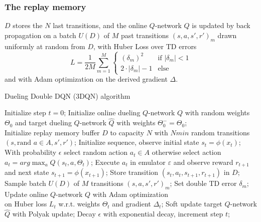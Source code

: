 \documentclass[journal]{IEEEtran}
\begin{document}
\subsubsection{The replay memory} $D$ stores the $N$ last transitions, and the online $Q$-network $Q$ is updated by back propagation on a batch $U(D)$ of $M$ past transitions $(s,a,s',r')_m$ drawn uniformly at random from $D$, with Huber Loss over TD errors
\[ 
L = \frac{1}{2M}\sum_{m=1}^M
\begin{cases}
  (\delta_m)^2 & \text{if } |\delta_m| < 1 \\
  2 \cdot |\delta_m| - 1 & \text{else}
\end{cases}
\]
and with Adam optimization \cite{kingma2017adam} on the derived gradient $\Delta$.

\begin{algorithm}[H]
\caption*{Dueling Double DQN (3DQN) algorithm}
\begin{algorithmic}
    \STATE Initialize step $t = 0$;
    \STATE Initialize online dueling $Q$-network $Q$ with random weights $\Theta_0$ and target dueling $Q$-network $\widehat{Q}$ with weights $\Theta^-_0 = \Theta_0$; \\
    \STATE Initialize replay memory buffer $D$ to capacity $N$
    \STATE with $Nmin$ random transitions $(s,\text{rand }a \in A,s',r')$;
        \STATE Initialize sequence, observe initial state $s_t=\phi(x_t)$;
            \STATE With probability $\epsilon$ select random action $a_t \in A$
            \STATE otherwise select action $a_t = arg\max_{a}Q(s_t,a,\Theta_t)$;
            \STATE Execute $a_t$ in emulator $\varepsilon$ and
            \STATE observe reward $r_{t+1}$ and next state $s_{t+1}=\phi(x_{t+1})$;
            \STATE Store transition $(s_t,a_t,s_{t+1},r_{t+1})$ in $D$;
            \STATE Sample batch $U(D)$ of $M$ transitions $(s,a,s',r')_m$;
                \STATE Set double TD error $\delta_m$;
            \ENDFOR
            \STATE Update online $Q$-network $Q$ with Adam optimization \\
            on Huber loss $L_t$ w.r.t. weights $\Theta_t$ and gradient $\Delta_t$;
            \STATE Soft update target $Q$-network $\widehat{Q}$ with Polyak update;
            \STATE Decay $\epsilon$ with exponential decay, increment step $t$;
        \ENDWHILE
    \ENDFOR
\end{algorithmic}
\end{algorithm}
\end{document}
